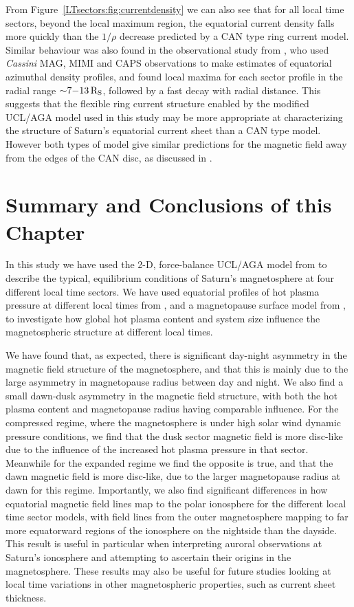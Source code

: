 From Figure~\ref{LTsectors:fig:currentdensity} we can also see that for all local time sectors, beyond the local maximum region, the equatorial current density falls more quickly than the $1/\rho$ decrease predicted by a CAN type ring current model. Similar behaviour was also found in the observational study from \citet{sergis2017}, who used \textit{Cassini} MAG, MIMI and CAPS observations to make estimates of equatorial azimuthal density profiles, and found local maxima for each sector profile in the radial range ${\sim}7{\--}\SI{13}{R_S}$, followed by a fast decay with radial distance. This suggests that the flexible ring current structure enabled by the modified UCL/AGA model used in this study may be more appropriate at characterizing the structure of Saturn's equatorial current sheet than a CAN type model. However both types of model give similar predictions for the magnetic field away from the edges of the CAN disc, as discussed in \citet{achilleos2010a}.

\section{Summary and Conclusions of this Chapter} \label{LTsectors:sec:conclusions}
In this study we have used the 2-D, force-balance UCL/AGA model from \citet{achilleos2010a} to describe the typical, equilibrium conditions of Saturn's magnetosphere at four different local time sectors. We have used equatorial profiles of hot plasma pressure at different local times from \citet{sergis2017}, and a magnetopause surface model from \citet{pilkington2015b}, to investigate how global hot plasma content and system size influence the magnetospheric structure at different local times.

We have found that, as expected, there is significant day-night asymmetry in the magnetic field structure of the magnetosphere, and that this is mainly due to the large asymmetry in magnetopause radius between day and night. We also find a small dawn-dusk asymmetry in the magnetic field structure, with both the hot plasma content and magnetopause radius having comparable influence. For the compressed regime, where the magnetosphere is under high solar wind dynamic pressure conditions, we find that the dusk sector magnetic field is more disc-like due to the influence of the increased hot plasma pressure in that sector. Meanwhile for the expanded regime we find the opposite is true, and that the dawn magnetic field is more disc-like, due to the larger magnetopause radius at dawn for this regime. Importantly, we also find significant differences in how equatorial magnetic field lines map to the polar ionosphere for the different local time sector models, with field lines from the outer magnetosphere mapping to far more equatorward regions of the ionosphere on the nightside than the dayside. This result is useful in particular when interpreting auroral observations at Saturn's ionosphere and attempting to ascertain their origins in the magnetosphere. These results may also be useful for future studies looking at local time variations in other magnetospheric properties, such as current sheet thickness.

